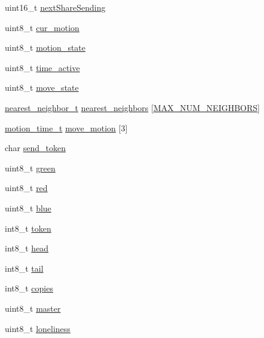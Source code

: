 \begin{DoxyCompactItemize}
\item 
uint16\+\_\+t \hyperlink{structUSERDATA_a4e0877e8d8bb437599bb256e9ddfbb15}{next\+Share\+Sending}
\item 
uint8\+\_\+t \hyperlink{structUSERDATA_a776accb60751dfaaef71a780aa26565e}{cur\+\_\+motion}
\item 
uint8\+\_\+t \hyperlink{structUSERDATA_a4084614536346cdd65a7c1e563c4f7b0}{motion\+\_\+state}
\item 
uint8\+\_\+t \hyperlink{structUSERDATA_ac7d7ea7ea2501228ad03e408fd68c1cf}{time\+\_\+active}
\item 
uint8\+\_\+t \hyperlink{structUSERDATA_a7a804c64ea1fbe6dc1342c53f1c8ebbb}{move\+\_\+state}
\item 
\hyperlink{structnearest__neighbor__t}{nearest\+\_\+neighbor\+\_\+t} \hyperlink{structUSERDATA_a832531c1f98fb79baf05dc6c9b5e40db}{nearest\+\_\+neighbors} \mbox{[}\hyperlink{ring_8h_a7f85654336ae45adee0001ba8cdb8851}{M\+A\+X\+\_\+\+N\+U\+M\+\_\+\+N\+E\+I\+G\+H\+B\+O\+RS}\mbox{]}
\item 
\hyperlink{structmotion__time__t}{motion\+\_\+time\+\_\+t} \hyperlink{structUSERDATA_a7e5fcf447d94ea3ee0374dec1af33ced}{move\+\_\+motion} \mbox{[}3\mbox{]}
\item 
char \hyperlink{structUSERDATA_ac453af1691815ef29a28f1a3c46ae841}{send\+\_\+token}
\item 
uint8\+\_\+t \hyperlink{structUSERDATA_a25eeb02dc0734abc99a841f18ffddc28}{green}
\item 
uint8\+\_\+t \hyperlink{structUSERDATA_a489b2c5c4ef2024d3b9b1972850facee}{red}
\item 
uint8\+\_\+t \hyperlink{structUSERDATA_aa5fb7ae10345095126fa610507cddb0c}{blue}
\item 
int8\+\_\+t \hyperlink{structUSERDATA_a17041ea19109a5925a2cb85d81fe94fe}{token}
\item 
int8\+\_\+t \hyperlink{structUSERDATA_af984a0399620cf277141904659331368}{head}
\item 
int8\+\_\+t \hyperlink{structUSERDATA_ac819bf5223dffc8a3254560bf8b89647}{tail}
\item 
int8\+\_\+t \hyperlink{structUSERDATA_aad8db2cafd0a9eb290b9f0a1d2b2d9bc}{copies}
\item 
uint8\+\_\+t \hyperlink{structUSERDATA_a5ef5687d729163b5a69f2a77bdddafd5}{master}
\item 
uint8\+\_\+t \hyperlink{structUSERDATA_a08128e6bfe49aca26f1cf7502326bd53}{loneliness}
\end{DoxyCompactItemize}


